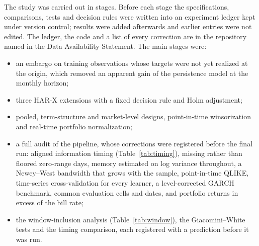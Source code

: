 The study was carried out in stages. Before each stage the specifications,
comparisons, tests and decision rules were written into an experiment ledger
kept under version control; results were added afterwards and earlier entries
were not edited. The ledger, the code and a list of every correction are in
the repository named in the Data Availability Statement. The main stages
were:
\begin{itemize}
\item an embargo on training observations whose targets were not yet
realized at the origin, which removed an apparent gain of the persistence
model at the monthly horizon;
\item three HAR-X extensions with a fixed decision rule and Holm adjustment;
\item pooled, term-structure and market-level designs, point-in-time
winsorization and real-time portfolio normalization;
\item a full audit of the pipeline, whose corrections were registered before
the final run: aligned information timing (Table~\ref{tab:timing}), missing
rather than floored zero-range days, memory estimated on log variance
throughout, a Newey--West bandwidth that grows with the sample, point-in-time
QLIKE, time-series cross-validation for every learner, a level-corrected
GARCH benchmark, common evaluation cells and dates, and portfolio returns in
excess of the bill rate;
\item the window-inclusion analysis (Table~\ref{tab:window}), the
Giacomini--White tests and the timing comparison, each registered with a
prediction before it was run.
\end{itemize}
